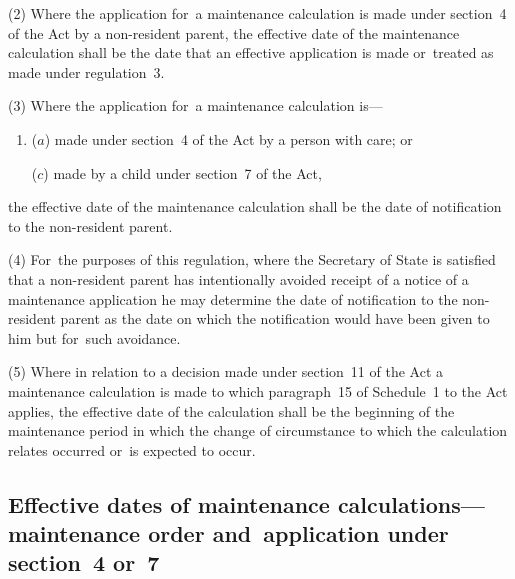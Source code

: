 \documentclass[12pt,a4paper]{article}
\begin{document}
(2) Where the application for~a maintenance calculation is made under section~4 of the Act by a non-resident parent, the effective date of the maintenance calculation shall be the date that an effective application is made or~treated as made under regulation~3.

(3) Where the application for~a maintenance calculation is—
\begin{enumerate}\item[]
($a$) made under section~4 of the Act by a person with care;
%
or

($c$) made by a child under section~7 of the Act,
\end{enumerate}
the effective date of the maintenance calculation shall be the date of notification to the non-resident parent.

(4) For~the purposes of this regulation, where the Secretary of State is satisfied that a non-resident parent has intentionally avoided receipt of a notice of a maintenance application he may determine the date of notification to the non-resident parent as the date on which the notification would have been given to him but for~such avoidance.

(5) Where in relation to a decision made under section~11 of the Act a maintenance calculation is made to which paragraph~15 of Schedule~1 to the Act applies, the effective date of the calculation shall be the beginning of the maintenance period in which the change of circumstance to which the calculation relates occurred or~is expected to occur.


\subsection[26. Effective dates of maintenance calculations—maintenance order and~application under section~4 or~7]{\sloppy Effective dates of maintenance calculations—\hspace{0pt}maintenance order and~application under section~4 or~7}
\end{document}
